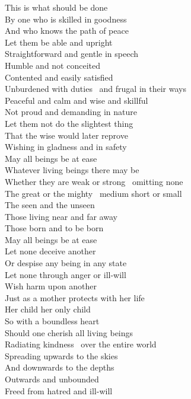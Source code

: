 This is what should be done\\
By one who is skilled in goodness\\
And who knows the path of peace\\
Let them be able and upright\\
Straightforward and gentle in speech\\
Humble and not conceited\\
Contented and easily satisfied\\
Unburdened with duties \breathmark\ and frugal in their ways\\
Peaceful and calm and wise and skillful\\
Not proud and demanding in nature\\
Let them not do the slightest thing\\
That the wise would later reprove\\
Wishing in gladness and in safety\\
May all beings be at ease\\
Whatever living beings there may be\\
Whether they are weak or strong \breathmark\ omitting none\\
The great or the mighty \breathmark\ medium short or small\\
The seen and the unseen\\
Those living near and far away\\
Those born and to be born\\
May all beings be at ease\\
Let none deceive another\\
Or despise any being in any state\\
Let none through anger or ill-will\\
Wish harm upon another\\
Just
as a mother protects with her life\\
Her child her only child\\
So with a boundless heart\\
Should one cherish all living beings\\
Radiating kindness \breathmark\ over the entire world\\
Spreading upwards to the skies\\
And downwards to the depths\\
Outwards and unbounded\\
Freed from hatred and ill-will\\
